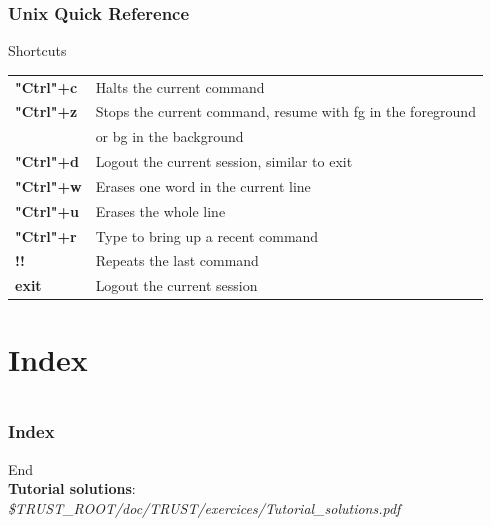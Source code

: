 \documentclass[10pt, hyperref={unicode=true,pdfusetitle, bookmarks=true,bookmarksnumbered=false,bookmarksopen=false, breaklinks=false,pdfborder={0 0l 1},backref=true,colorlinks=true,linkcolor=darkblue,pageanchor}]{beamer}
\begin{document}
\begin{frame}
\frametitle{Unix Quick Reference}
\begin{block}{Shortcuts}

\begin{tabular}{ll}
\textbf{"Ctrl"+c} & Halts the current command                                     \tabularnewline
\textbf{"Ctrl"+z} & Stops the current command, resume with fg in the foreground   \tabularnewline
                & or bg in the background                                       \tabularnewline
\textbf{"Ctrl"+d} & Logout the current session, similar to exit                   \tabularnewline
\textbf{"Ctrl"+w} & Erases one word in the current line                           \tabularnewline
\textbf{"Ctrl"+u} & Erases the whole line                                         \tabularnewline
\textbf{"Ctrl"+r} & Type to bring up a recent command                             \tabularnewline
\textbf{!!}     & Repeats the last command                                      \tabularnewline
\textbf{exit}   & Logout the current session                                    \tabularnewline
\end{tabular}

\end{block}
\end{frame}


\section{{\bf{Index}}}
\begin{frame}
\begin{small}
\begin{columns}[c] 
\tableofcontents[sections={1-8},currentsection, currentsubsection]
\tableofcontents[sections={9-16},currentsection, currentsubsection]
\end{columns}
\end{small}
\end{frame}
\begin{frame}[allowframebreaks]
\frametitle{Index}
\printindex
\end{frame}


\begin{frame}
\begin{center}
{\Huge{End}}\\
\vspace{2cm}
\textbf{Tutorial solutions}: \textit{\$TRUST\_ROOT/doc/TRUST/exercices/Tutorial\_solutions.pdf}
\end{center}
\end{frame}
\end{document}
